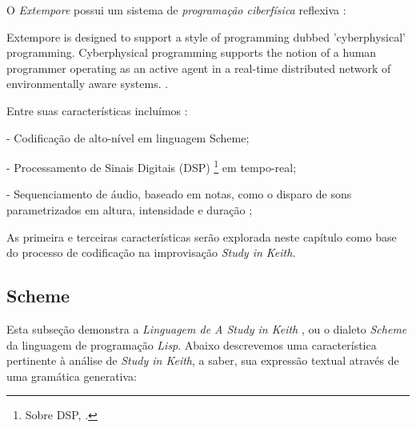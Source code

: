O \emph{Extempore} possui um sistema de \emph{programação ciberfísica} reflexiva :

\begin{citacao}
 {Extempore is designed to support a style of programming dubbed 'cyberphysical' programming. Cyberphysical programming supports the notion of a human programmer operating as an active agent in a real-time distributed network of environmentally aware systems. . }
\end{citacao}

Entre suas características incluímos :

- Codificação  de alto-nível em linguagem Scheme;

- Processamento de Sinais Digitais (DSP) \footnote{Sobre DSP, .} em  tempo-real;

- Sequenciamento de áudio, baseado em notas, como o disparo de sons parametrizados em altura, intensidade e duração ;

As primeira e terceiras características serão explorada neste capítulo como base do processo de codificação na improvisação \emph{Study in Keith}.

\subsection{Scheme}\label{sec:scheme}

Esta subseção demonstra a \emph{Linguagem de A Study in Keith} , ou o dialeto \emph{Scheme} da linguagem de programação \emph{Lisp}. Abaixo descrevemos uma característica pertinente à análise de \emph{Study in Keith}, a saber, sua expressão textual através de uma gramática generativa:


